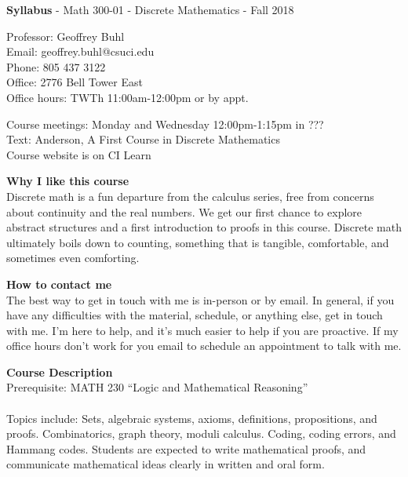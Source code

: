 \documentclass[11pt]{article}
\begin{document}
\begin{center}
{\bf Syllabus} - Math 300-01 - Discrete Mathematics - Fall 2018
\end{center}

Professor: Geoffrey Buhl\\
Email: geoffrey.buhl@csuci.edu\\ 
Phone: 805 437 3122\\
Office: 2776 Bell Tower East\\
Office hours:  TWTh 11:00am-12:00pm or  by appt.


Course meetings:  Monday and Wednesday 12:00pm-1:15pm in ???\\
Text: Anderson, A First Course in Discrete Mathematics \\
Course website is on CI Learn

{\bf Why I like this course}\\
Discrete math is a fun departure from the calculus series, free from concerns about continuity and the real numbers.  We get our first chance to explore abstract structures and a first introduction to proofs in this course.  Discrete math ultimately boils down to counting, something that is tangible, comfortable, and sometimes even comforting.


{\bf How to contact me}\\
The best way to get in touch with me is in-person or by email.  In general, if you have any difficulties with the material, schedule, or anything else, get in touch with me. I'm here to help, and it's much easier to help if you are proactive.  If my office hours don't work for you email to schedule an appointment to talk with me.


{\bf Course Description}\\
Prerequisite: MATH 230 ``Logic and Mathematical Reasoning''\\
\\
Topics include: Sets, algebraic systems, axioms, definitions, propositions, and proofs. Combinatorics, graph theory, moduli calculus.  Coding, coding errors, and Hammang codes.  Students are expected to write mathematical proofs, and communicate mathematical ideas clearly in written and oral form.
\end{document}
